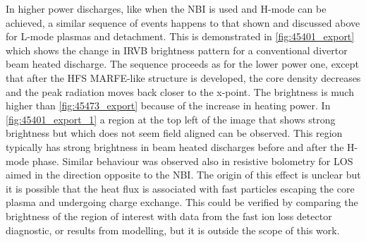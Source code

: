In higher power discharges, like when the NBI is used and H-mode can be achieved, a similar sequence of events happens to that shown and discussed above for L-mode plasmas and detachment. This is demonstrated in \autoref{fig:45401_export} which shows the change in IRVB brightness pattern for a conventional divertor beam heated discharge. The sequence proceeds as for the lower power one, except that after the HFS MARFE-like structure is developed, the core density decreases and the peak radiation moves back closer to the x-point. The brightness is much higher than \autoref{fig:45473_export} because of the increase in heating power. In \autoref{fig:45401_export_1} a region at the top left of the image that shows strong brightness but which does not seem field aligned can be observed. This region typically has strong brightness in beam heated discharges before and after the H-mode phase. Similar behaviour was observed also in resistive bolometry for LOS aimed in the direction opposite to the NBI. The origin of this effect is unclear but it is possible that the heat flux is associated with fast particles escaping the core plasma and undergoing charge exchange. This could be verified by comparing the brightness of the region of interest with data from the fast ion loss detector diagnostic, or results from modelling, but it is outside the scope of this work.

